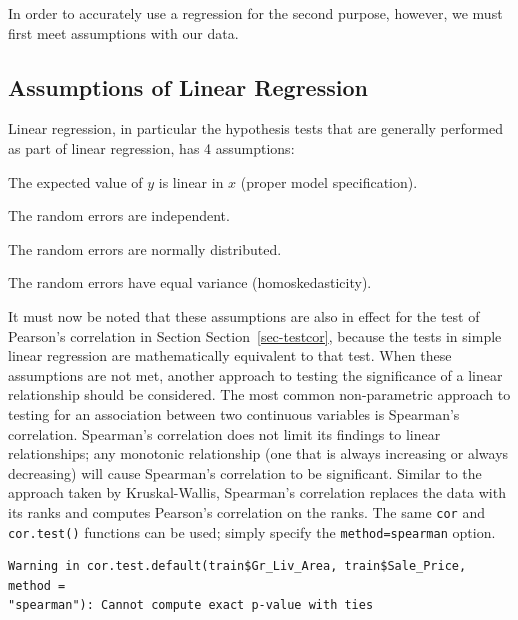 \documentclass[
  letterpaper,
  DIV=11,
  numbers=noendperiod]{scrreprt}
\newenvironment{Shaded}{\begin{snugshade}}{\end{snugshade}}
\newcommand{\AttributeTok}[1]{\textcolor[rgb]{0.40,0.45,0.13}{#1}}
\newcommand{\FunctionTok}[1]{\textcolor[rgb]{0.28,0.35,0.67}{#1}}
\newcommand{\NormalTok}[1]{\textcolor[rgb]{0.00,0.23,0.31}{#1}}
\newcommand{\SpecialCharTok}[1]{\textcolor[rgb]{0.37,0.37,0.37}{#1}}
\newcommand{\StringTok}[1]{\textcolor[rgb]{0.13,0.47,0.30}{#1}}
\begin{document}
In order to accurately use a regression for the second purpose, however,
we must first meet assumptions with our data.

\hypertarget{sec-slrassumptions}{%
\subsection{Assumptions of Linear Regression}\label{sec-slrassumptions}}

Linear regression, in particular the hypothesis tests that are generally
performed as part of linear regression, has 4 assumptions:

The expected value of \(y\) is linear in \(x\) (proper model
specification).

The random errors are independent.

The random errors are normally distributed.

The random errors have equal variance (homoskedasticity).

It must now be noted that these assumptions are also in effect for the
test of Pearson's correlation in Section Section~\ref{sec-testcor},
because the tests in simple linear regression are mathematically
equivalent to that test. When these assumptions are not met, another
approach to testing the significance of a linear relationship should be
considered. The most common non-parametric approach to testing for an
association between two continuous variables is Spearman's correlation.
Spearman's correlation does not limit its findings to linear
relationships; any monotonic relationship (one that is always increasing
or always decreasing) will cause Spearman's correlation to be
significant. Similar to the approach taken by Kruskal-Wallis, Spearman's
correlation replaces the data with its ranks and computes Pearson's
correlation on the ranks. The same \texttt{cor} and \texttt{cor.test()}
functions can be used; simply specify the
\texttt{method=\textquotesingle{}spearman\textquotesingle{}} option.

\begin{Shaded}
\end{Shaded}

\begin{verbatim}
Warning in cor.test.default(train$Gr_Liv_Area, train$Sale_Price, method =
"spearman"): Cannot compute exact p-value with ties
\end{verbatim}
\end{document}
